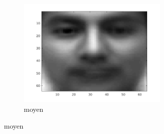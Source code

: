 \documentclass[a4paper]{article}
\begin{document}
\begin{figure}[H]
    \centering
     
    \begin{subfigure}[c]{0.24\textwidth}
        \centering
        \includegraphics[width=0.8\textwidth]{images/ex1_x_centre.png}
        \caption{moyen}
        \label{subfig:ex1_x_centre}
    \end{subfigure}


\end{figure}
\end{document}
